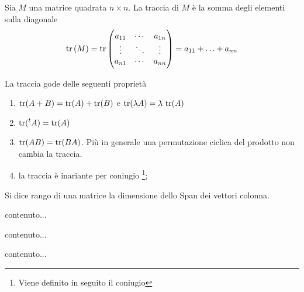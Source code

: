 
\begin{definition}[Traccia]
	Sia $ M $ una matrice quadrata $ n \times n $. La traccia di $ M $ è la somma degli elementi sulla diagonale 
	\[\operatorname{tr}{(M)} = \operatorname{tr}{ 
	\begin{pmatrix}
	a_{11} & \cdots  & a_{1n} \\
	\vdots & \ddots & \vdots \\
	a_{n1} & \cdots  & a_{nn} \\
	\end{pmatrix}}
	= a_{11} + \ldots + a_{nn}\]
\end{definition}

\begin{propriety}
	La traccia gode delle seguenti proprietà
	\begin{enumerate}[label=(\roman*)]
		\item $ \operatorname{tr} (A + B) = \operatorname{tr}(A) + \operatorname{tr}(B) $ e $ \operatorname{tr}(\lambda A) = \lambda \, \operatorname{tr} (A) $
		\item $ \operatorname{tr}(\prescript{t}{}{A}) = \operatorname{tr} (A) $
		\item $ \operatorname{tr} (AB) = \operatorname{tr} (BA) $. Più in generale una permutazione ciclica del prodotto non cambia la traccia.
		\item la traccia è inariante per coniugio
			\footnote{Viene definito in seguito il coniugio};
	\end{enumerate}
\end{propriety}

\begin{definition}[Rango]
	Si dice rango di una matrice la dimensione dello Span dei vettori colonna.
\end{definition}

\begin{definition}
	contenuto...
\end{definition}

\begin{definition}
	contenuto...
\end{definition}

\begin{definition}[Pivot]
	contenuto...
\end{definition}

